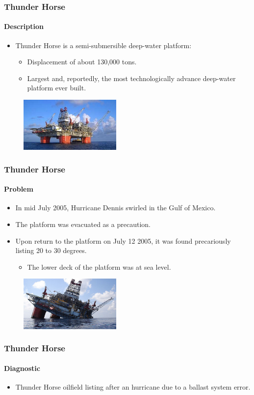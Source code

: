 \begin{frame}[hasprev=false, hasnext=true]
\label{example:thunder-horse}
\frametitle{Thunder Horse}
\framesubtitle{Description}

\begin{itemize}
	\item Thunder Horse is a semi-submersible deep-water platform:
	\begin{itemize}
		\item Displacement of about 130,000 tons.
		\item Largest and, reportedly, the most technologically advance
		deep-water platform ever built.
	\end{itemize}
\end{itemize}

\begin{figure}
	\includegraphics[width=5cm]{aux/examples/thunder-horse/thunder-horse-before}
\end{figure}
\end{frame}


\begin{frame}[hasprev=true, hasnext=true]
\frametitle{Thunder Horse}
\framesubtitle{Problem}

\begin{itemize}
	\item In mid July 2005, Hurricane Dennis swirled in the Gulf of Mexico.

	\item The platform was evacuated as a precaution.

	\item Upon return to the platform on July 12 2005, it was found
	precariously listing 20 to 30 degrees.
	\begin{itemize}
		\item The lower deck of the platform was at sea level.
	\end{itemize}
\end{itemize}

\begin{figure}
	\centering
	\includegraphics[width=5cm]{aux/examples/thunder-horse/thunder-horse-after}
\end{figure}
\end{frame}


\begin{frame}[hasprev=true, hasnext=false]
\frametitle{Thunder Horse}
\framesubtitle{Diagnostic}

\begin{itemize}
	\item Thunder Horse oilfield listing after an hurricane due to a ballast
	system error.
\end{itemize}
\end{frame}